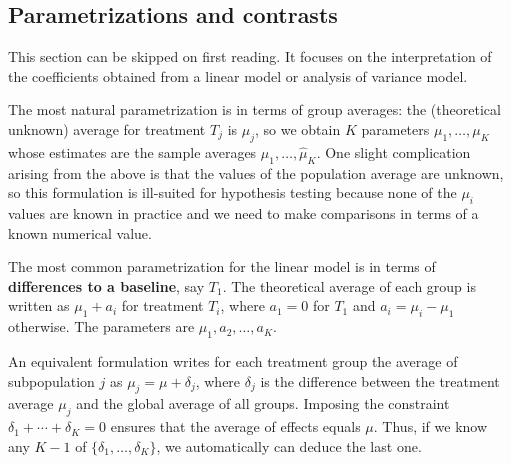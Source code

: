 \documentclass[
  11pt,
  letterpaper,
]{scrbook}
\theoremstyle{definition}
\theoremstyle{remark}
\begin{document}
\hypertarget{parametrizations-and-contrasts}{%
\subsection{Parametrizations and
contrasts}\label{parametrizations-and-contrasts}}

This section can be skipped on first reading. It focuses on the
interpretation of the coefficients obtained from a linear model or
analysis of variance model.

The most natural parametrization is in terms of group averages: the
(theoretical unknown) average for treatment \(T_j\) is \(\mu_j\), so we
obtain \(K\) parameters \(\mu_1, \ldots, \mu_K\) whose estimates are the
sample averages \(\widehat{\mu}_1, \ldots, \widehat{\mu}_K\). One slight
complication arising from the above is that the values of the population
average are unknown, so this formulation is ill-suited for hypothesis
testing because none of the \(\mu_i\) values are known in practice and
we need to make comparisons in terms of a known numerical value.

The most common parametrization for the linear model is in terms of
\textbf{differences to a baseline}, say \(T_1\). The theoretical average
of each group is written as \(\mu_1 + a_i\) for treatment \(T_i\), where
\(a_1=0\) for \(T_1\) and \(a_i = \mu_i-\mu_1\) otherwise. The
parameters are \(\mu_1, a_2, \ldots, a_K\).

An equivalent formulation writes for each treatment group the average of
subpopulation \(j\) as \(\mu_j = \mu + \delta_j\), where \(\delta_j\) is
the difference between the treatment average \(\mu_j\) and the global
average of all groups. Imposing the constraint
\(\delta_1 + \cdots + \delta_K=0\) ensures that the average of effects
equals \(\mu\). Thus, if we know any \(K-1\) of
\(\{\delta_1, \ldots, \delta_K\}\), we automatically can deduce the last
one.
\end{document}
